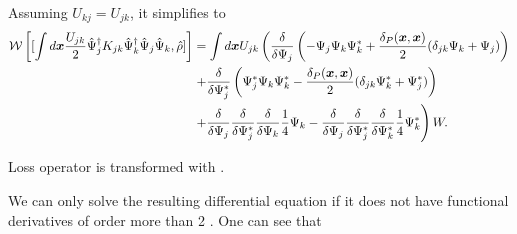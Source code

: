 Assuming $U_{kj} = U_{jk}$, it simplifies to
\begin{equation*}
\begin{split}
	\mathcal{W} \left[
		[
			\int d\boldsymbol{x} \frac{U_{jk}}{2}
				\hat{\Psi}_j^\dagger K_{jk} \hat{\Psi}_k^\dagger \hat{\Psi}_j \hat{\Psi}_k,
			\hat{\rho}
		]
	\right]
	& = \int d\boldsymbol{x} U_{jk} \left(
		\frac{\delta}{\delta \Psi_j} \left(
			- \Psi_j \Psi_k \Psi_k^*
			+ \frac{\delta_P(\boldsymbol{x}, \boldsymbol{x})}{2} ( \delta_{jk} \Psi_k + \Psi_j )
		\right) \right. \\
	&	\left. + \frac{\delta}{\delta \Psi_j^*} \left(
			\Psi_j^* \Psi_k \Psi_k^*
			- \frac{\delta_P(\boldsymbol{x}, \boldsymbol{x})}{2} ( \delta_{jk} \Psi_k^* + \Psi_j^* )
		\right) \right. \\
	&	\left.
			+ \frac{\delta}{\delta \Psi_j}
			\frac{\delta}{\delta \Psi_j^*}
			\frac{\delta}{\delta \Psi_k}
			\frac{1}{4} \Psi_k
			- \frac{\delta}{\delta \Psi_j}
			\frac{\delta}{\delta \Psi_j^*}
			\frac{\delta}{\delta \Psi_k^*}
			\frac{1}{4} \Psi_k^*
		\right) W.
\end{split}
\end{equation*}

Loss operator is transformed with .

We can only solve the resulting differential equation if it does not have functional derivatives of order more than 2 .
One can see that


